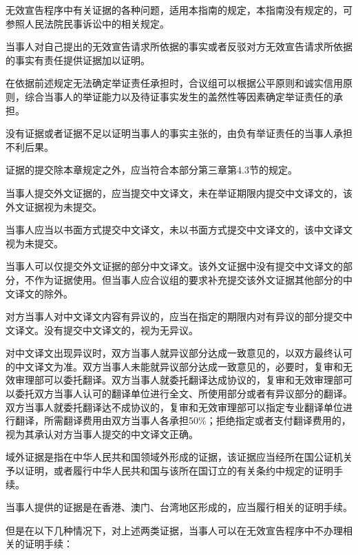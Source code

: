 无效宣告程序中有关证据的各种问题，适用本指南的规定，本指南没有规定的，可参照人民法院民事诉讼中的相关规定。

当事人对自己提出的无效宣告请求所依据的事实或者反驳对方无效宣告请求所依据的事实有责任提供证据加以证明。

在依据前述规定无法确定举证责任承担时，合议组可以根据公平原则和诚实信用原则，综合当事人的举证能力以及待证事实发生的盖然性等因素确定举证责任的承担。

没有证据或者证据不足以证明当事人的事实主张的，由负有举证责任的当事人承担不利后果。

证据的提交除本章规定之外，应当符合本部分第三章第4.3节的规定。

当事人提交外文证据的，应当提交中文译文，未在举证期限内提交中文译文的，该外文证据视为未提交。

当事人应当以书面方式提交中文译文，未以书面方式提交中文译文的，该中文译文视为未提交。

当事人可以仅提交外文证据的部分中文译文。该外文证据中没有提交中文译文的部分，不作为证据使用。但当事人应合议组的要求补充提交该外文证据其他部分的中文译文的除外。

对方当事人对中文译文内容有异议的，应当在指定的期限内对有异议的部分提交中文译文。没有提交中文译文的，视为无异议。

对中文译文出现异议时，双方当事人就异议部分达成一致意见的，以双方最终认可的中文译文为准。双方当事人未能就异议部分达成一致意见的，必要时，复审和无效审理部可以委托翻译。双方当事人就委托翻译达成协议的，复审和无效审理部可以委托双方当事人认可的翻译单位进行全文、所使用部分或者有异议部分的翻译。双方当事人就委托翻译达不成协议的，复审和无效审理部可以指定专业翻译单位进行翻译，所需翻译费用由双方当事人各承担50\%；拒绝指定或者支付翻译费用的，视为其承认对方当事人提交的中文译文正确。

域外证据是指在中华人民共和国领域外形成的证据，该证据应当经所在国公证机关予以证明，或者履行中华人民共和国与该所在国订立的有关条约中规定的证明手续。

当事人提供的证据是在香港、澳门、台湾地区形成的，应当履行相关的证明手续。

但是在以下几种情况下，对上述两类证据，当事人可以在无效宣告程序中不办理相关的证明手续：

